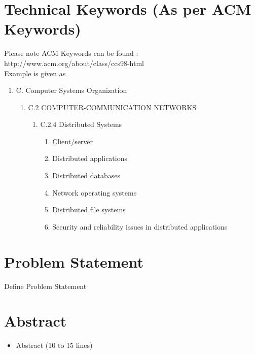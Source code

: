 \documentclass[oneside,a4paper,12pt]{report}
\begin{document}
\section{Technical Keywords (As per ACM Keywords)}
Please note ACM Keywords can be found : http://www.acm.org/about/class/ccs98-html \\
Example is given as
\begin{enumerate}
	\item C. Computer Systems Organization
	\begin{enumerate}
		\item C.2 COMPUTER-COMMUNICATION NETWORKS
		\begin{enumerate}
			\item C.2.4 Distributed Systems
			\begin{enumerate}
				\item  Client/server
\item Distributed applications
\item Distributed databases
\item Network operating systems
\item Distributed file systems
\item Security and reliability issues in distributed applications
	 		\end{enumerate}
		\end{enumerate}



	\end{enumerate}
\end{enumerate}



\section{Problem Statement}
\label{sec:problem}
        Define Problem Statement
\section{Abstract}
\begin{itemize}
	\item Abstract (10 to 15 lines)
\end{itemize}
\end{document}
